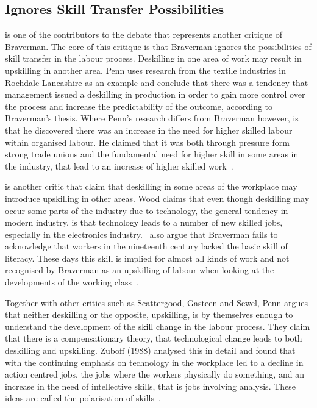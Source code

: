 \documentclass[a4paper,12pt,titlepage]{article}
\begin{document}
  \subsection{Ignores Skill Transfer Possibilities}
  \cite{rp:smwlp} is one of the contributors to the debate
  that represents another critique of Braverman. The core of
  this critique is that Braverman ignores the possibilities of skill
  transfer in the labour process. Deskilling in one area of work
  may result in upskilling in another area. Penn
  uses research from the textile industries in Rochdale Lancashire
  as an example
  and conclude that there was a tendency that management issued
  a deskilling in production in order to gain more control over the
  process and increase the predictability of the outcome, according to
  Braverman's thesis. Where Penn's research differs from Braverman however,
  is that he discovered there was an increase in the need for
  higher skilled labour within organised labour. He claimed that
  it was both through pressure form strong trade unions and the
  fundamental need for higher skill in some areas in the industry,
  that lead to an increase of higher skilled work~\cite[107]{rp:smwlp}.

  \cite{sw} is another critic that claim that deskilling in some
  areas of the workplace may introduce upskilling in other areas. 
  Wood claims that even though deskilling
  may occur some parts of the industry due to technology, the general
  tendency in modern industry, is that technology leads to a number
  of new skilled jobs, especially in the electronics industry.~\cite{sw}
  also argue that Braverman fails to acknowledge that workers in
  the nineteenth century lacked the basic skill of literacy. These
  days this skill is implied for almost all kinds of work and
  not recognised by Braverman as an upskilling of labour when
  looking at the developments of the working class~\cite[18-19]{sw}.

  Together with other critics such as Scattergood, Gasteen and Sewel, Penn
  argues that neither deskilling or the opposite, upskilling, is by
  themselves enough to understand the development of the skill change
  in the labour process. They claim that there is a compensationary
  theory, that technological change leads to both deskilling and upskilling.
  Zuboff (1988) analysed this in detail and found that with the
  continuing emphasis on technology in the workplace led to a decline
  in action centred jobs, the jobs where the workers physically
  do something, and an increase in the need of intellective skills, that is jobs
  involving analysis. These ideas are called the polarisation of
  skills~\cite[161-165]{mnpb}.
  
\end{document}
